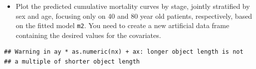 \documentclass[
]{book}
\newenvironment{Shaded}{\begin{snugshade}}{\end{snugshade}}
\newcommand{\AttributeTok}[1]{\textcolor[rgb]{0.13,0.29,0.53}{#1}}
\newcommand{\CommentTok}[1]{\textcolor[rgb]{0.56,0.35,0.01}{\textit{#1}}}
\newcommand{\DecValTok}[1]{\textcolor[rgb]{0.00,0.00,0.81}{#1}}
\newcommand{\FunctionTok}[1]{\textcolor[rgb]{0.13,0.29,0.53}{\textbf{#1}}}
\newcommand{\NormalTok}[1]{#1}
\newcommand{\OtherTok}[1]{\textcolor[rgb]{0.56,0.35,0.01}{#1}}
\newcommand{\SpecialCharTok}[1]{\textcolor[rgb]{0.81,0.36,0.00}{\textbf{#1}}}
\newcommand{\StringTok}[1]{\textcolor[rgb]{0.31,0.60,0.02}{#1}}
\providecommand{\tightlist}{%
  \setlength{\itemsep}{0pt}\setlength{\parskip}{0pt}}
\begin{document}
\begin{itemize}
\tightlist
\item
  Plot the predicted cumulative mortality curves by stage,
  jointly stratified by sex and age, focusing
  only on 40 and 80 year old patients, respectively,
  based on the fitted model \texttt{m2}.
  You need to create a new artificial data frame
  containing the desired values for the covariates.
\end{itemize}

\begin{Shaded}
\end{Shaded}

\begin{verbatim}
## Warning in ay * as.numeric(nx) + ax: longer object length is not
## a multiple of shorter object length
\end{verbatim}
\end{document}
